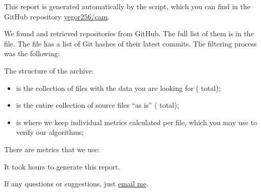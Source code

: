 \documentclass[nobrand,nosecurity]{huawei}
\begin{document}
\maketitle

This report is generated automatically by the script, which you can find in
the GitHub repository \href{https://github.com/yegor256/cam}{yegor256/cam}.

We found and retrieved 
repositories from GitHub.
The full list of them is in the  file.
The  file has a list of Git hashes of their latest commits.
The filtering process was the following:

\begin{enumerate}
\end{enumerate}

The structure of the archive:

\begin{itemize}
  \item {} is the collection of  files with the data
  you are looking for ( total);

  \item {} is the entire collection of
  source files ``as is''
  ( total);

  \item {} is where we keep individual metrics calculated
  per file, which you may use to verify our algorithms;
\end{itemize}

There are  metrics that we use:

\begin{itemize}
  
\end{itemize}

It took  hours
to generate this report.

If any questions or suggestions, just \href{mailto:yegor256@gmail.com}{email me}.
\end{document}
